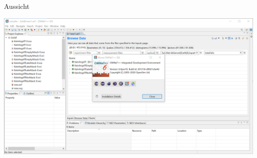 
\begin{frame}{Aussicht}%
	\begin{center}%
		\begin{adjustbox}{width=\textwidth, height= 0.8\textheight, keepaspectratio}%
			\includegraphics{pic/omnet6}%
		\end{adjustbox}
	\end{center}
\end{frame}